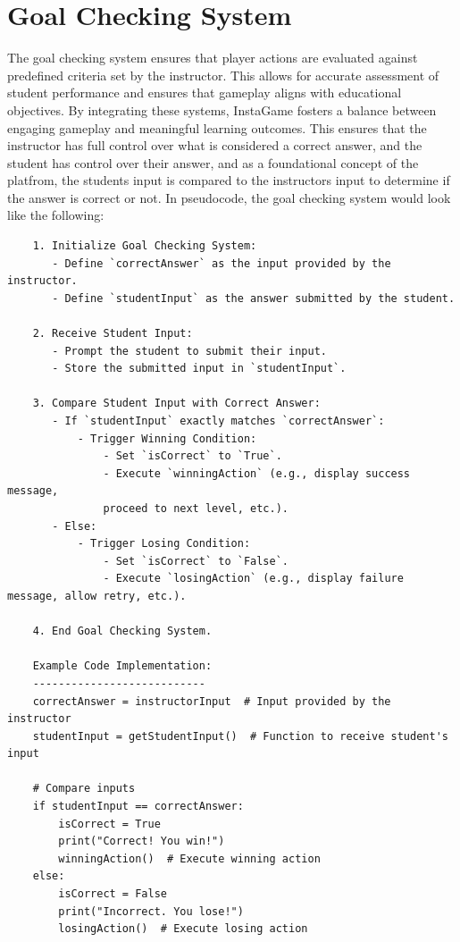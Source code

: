 \section{Goal Checking System}
The goal checking system ensures that player actions are evaluated against predefined criteria set by the instructor. This allows for accurate assessment of student performance and ensures that gameplay aligns with educational objectives. By integrating these systems, InstaGame fosters a balance between engaging gameplay and meaningful learning outcomes. This ensures that the instructor has full control over what is considered a correct answer, and the student has control over their answer, and as a foundational concept of the platfrom, the students input is compared to the instructors input to determine if the answer is correct or not. In pseudocode, the goal checking system would look like the following:
\begin{verbatim}
	1. Initialize Goal Checking System:
	   - Define `correctAnswer` as the input provided by the instructor.
	   - Define `studentInput` as the answer submitted by the student.
	
	2. Receive Student Input:
	   - Prompt the student to submit their input.
	   - Store the submitted input in `studentInput`.
	
	3. Compare Student Input with Correct Answer:
	   - If `studentInput` exactly matches `correctAnswer`:
		   - Trigger Winning Condition:
			   - Set `isCorrect` to `True`.
			   - Execute `winningAction` (e.g., display success message, 
			   proceed to next level, etc.).
	   - Else:
		   - Trigger Losing Condition:
			   - Set `isCorrect` to `False`.
			   - Execute `losingAction` (e.g., display failure message, allow retry, etc.).
	
	4. End Goal Checking System.
	
	Example Code Implementation:
	---------------------------
	correctAnswer = instructorInput  # Input provided by the instructor
	studentInput = getStudentInput()  # Function to receive student's input
	
	# Compare inputs
	if studentInput == correctAnswer:
		isCorrect = True
		print("Correct! You win!")
		winningAction()  # Execute winning action
	else:
		isCorrect = False
		print("Incorrect. You lose!")
		losingAction()  # Execute losing action
\end{verbatim}

